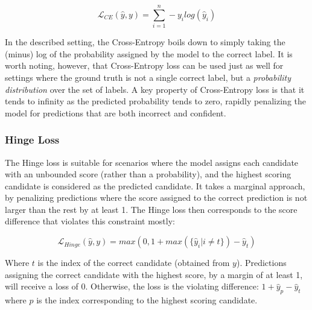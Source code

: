 \begin{equation}
    \mathcal{L}_{CE}(\hat{y}, y) = \sum_{i=1}^{n} -y_{i}log(\hat{y}_i)
    \label{crossentropy}
\end{equation}

In the described setting, the Cross-Entropy boils down to simply taking the (minus) log of the probability assigned by the model to the correct label. It is worth noting, however, that Cross-Entropy loss can be used just as well for settings where the ground truth is not a single correct label, but a \emph{probability distribution} over the set of labels. 
A key property of Cross-Entropy loss is that it tends to infinity as the predicted probability tends to zero, rapidly penalizing the model for predictions that are both incorrect and confident.

\subsubsection{Hinge Loss}
The Hinge loss is suitable for scenarios where the model assigns each candidate with an unbounded score (rather than a probability), and the highest scoring candidate is considered as the predicted candidate. It takes a marginal approach, by penalizing predictions where the score assigned to the correct prediction is not larger than the rest by at least 1. The Hinge loss then corresponds to the score difference that violates this constraint mostly:

\begin{equation}
    \mathcal{L}_{Hinge}(\hat{y}, y) = max(0, 1 + max(\{\hat{y}_{i} | i \neq t\}) - \hat{y}_t)    \label{hingeloss}
\end{equation}

Where $t$ is the index of the correct candidate (obtained from $y$). Predictions assigning the correct candidate with the highest score, by a margin of at least 1, will receive a loss of 0. Otherwise, the loss is the violating difference:  $ 1 + \hat{y}_p - \hat{y}_t $ where $p$ is the index corresponding to the highest scoring candidate.

